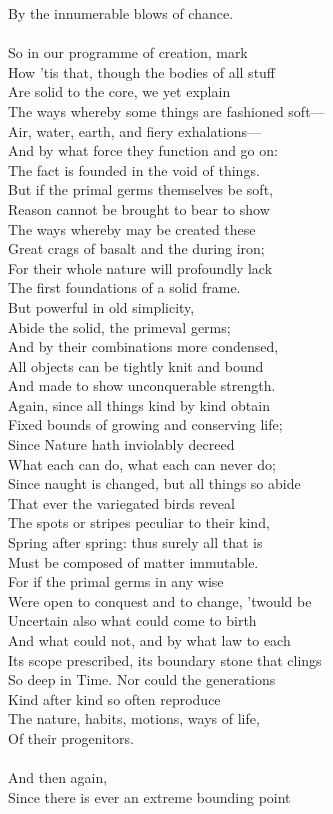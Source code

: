 By the innumerable blows of chance.\\
\\
So in our programme of creation, mark\\
How 'tis that, though the bodies of all stuff\\
Are solid to the core, we yet explain\\
The ways whereby some things are fashioned soft—\\
Air, water, earth, and fiery exhalations—\\
And by what force they function and go on:\\
The fact is founded in the void of things.\\
But if the primal germs themselves be soft,\\
Reason cannot be brought to bear to show\\
The ways whereby may be created these\\
Great crags of basalt and the during iron;\\
For their whole nature will profoundly lack\\
The first foundations of a solid frame.\\
But powerful in old simplicity,\\
Abide the solid, the primeval germs;\\
And by their combinations more condensed,\\
All objects can be tightly knit and bound\\
And made to show unconquerable strength.\\
Again, since all things kind by kind obtain\\
Fixed bounds of growing and conserving life;\\
Since Nature hath inviolably decreed\\
What each can do, what each can never do;\\
Since naught is changed, but all things so abide\\
That ever the variegated birds reveal\\
The spots or stripes peculiar to their kind,\\
Spring after spring: thus surely all that is\\
Must be composed of matter immutable.\\
For if the primal germs in any wise\\
Were open to conquest and to change, 'twould be\\
Uncertain also what could come to birth\\
And what could not, and by what law to each\\
Its scope prescribed, its boundary stone that clings\\
So deep in Time. Nor could the generations\\
Kind after kind so often reproduce\\
The nature, habits, motions, ways of life,\\
Of their progenitors.\\
\\
And then again,\\
Since there is ever an extreme bounding point

